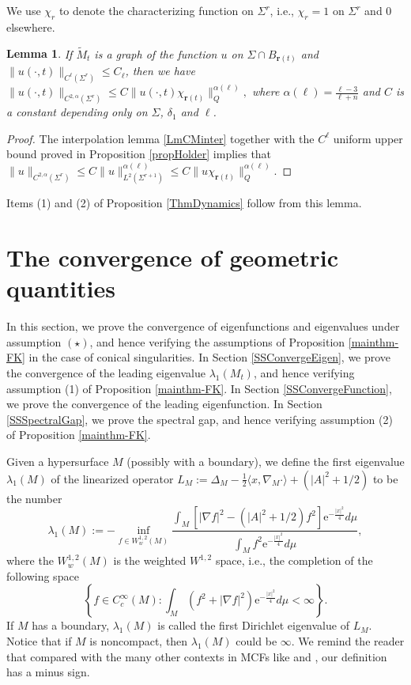 \documentclass[12pt]{amsart}
\numberwithin{equation}{section}
\newtheorem{lemma}[theorem]{Lemma}
\numberwithin{equation}{section}
\begin{document}
	We use $\chi_r$ to denote the characterizing function on $\Sigma^r$, i.e., $\chi_r=1$ on $\Sigma^r$ and $0$ elsewhere.
	
	
	\begin{lemma}\label{LmInterpolation}
		If $\widetilde M_t$ is a graph of the function $u$ on $\Sigma\cap B_{\mathbf{r}(t)}$ and $\|u(\cdot,t)\|_{C^\ell(\Sigma^r)}\leq C_\ell$, then we have 
		$		\|u(\cdot,t)\|_{C^{2,\alpha}(\Sigma^{r})}\leq C \|u(\cdot,t)\chi_{\mathbf{r}(t)}\|^{\alpha(\ell)}_{Q},$
		where $\alpha(\ell)=\frac{\ell-3}{\ell+n}$ and $C$ is a constant depending only on $\Sigma$, $\delta_1$ and $\ell$.
	\end{lemma}
	\begin{proof}
		The interpolation lemma \ref{LmCMinter} together with the $C^\ell$ uniform upper bound proved in Proposition \ref{propHolder} implies that
		$\|u\|_{C^{2,\alpha}(\Sigma^{r})}\leq C\|u\|^{\alpha(\ell)}_{L^2(\Sigma^{r+1})}\leq C\|u\chi_{\mathbf{r}(t)}\|^{\alpha(\ell)}_Q.$
	\end{proof}
	Items (1) and (2) of Proposition \ref{ThmDynamics} follow from this lemma. 
	
	\section{The convergence of geometric quantities}\label{SConvergence}
	In this section, we prove the convergence of eigenfunctions and eigenvalues under assumption $(\star)$, and hence verifying the assumptions of Proposition \ref{mainthm-FK} in the case of conical singularities. In Section \ref{SSConvergeEigen}, we prove the convergence of the leading eigenvalue $\lambda_1(M_t)$, and hence verifying assumption (1) of Proposition \ref{mainthm-FK}. In Section \ref{SSConvergeFunction}, we prove the convergence of the leading eigenfunction. In Section \ref{SSSpectralGap}, we prove the spectral gap, and hence verifying assumption (2) of Proposition \ref{mainthm-FK}.
	
	
	Given a hypersurface $M$ (possibly with a boundary), we define the first eigenvalue $\lambda_1(M)$ of the linearized operator $L_M:=\Delta_M-\frac{1}{2}\langle x,\nabla_M\cdot\rangle +(|A|^2+1/2)$ to be the number
	\begin{equation*}
		\lambda_1(M):=-\inf_{f\in W_w^{1,2}(M)}\frac{\int_M [|\nabla f|^2 -(|A|^2+1/2)f^2 ]\mathrm{e}^{-\frac{|x|^2}{4}}d\mu}{\int_M f^2 \mathrm{e}^{-\frac{|x|^2}{4}}d\mu},
	\end{equation*}
	where the $W_w^{1,2}(M)$ is the weighted $W^{1,2}$ space, i.e., the completion of the following space
	\begin{equation*}
		\left\{f\in C_c^\infty(M):\int_M (f^2+|\nabla f|^2)\mathrm{e}^{-\frac{|x|^2}{4}}d\mu<\infty\right\}.
	\end{equation*}
	If $M$ has a boundary, $\lambda_1(M)$ is called the first Dirichlet eigenvalue of $L_M$. Notice that if $M$ is noncompact, then $\lambda_1(M)$ could be $\infty$. We remind the reader that compared with the many other contexts in MCFs like \cite{CM1} and \cite{BW}, our definition has a minus sign.
	
\end{document}
